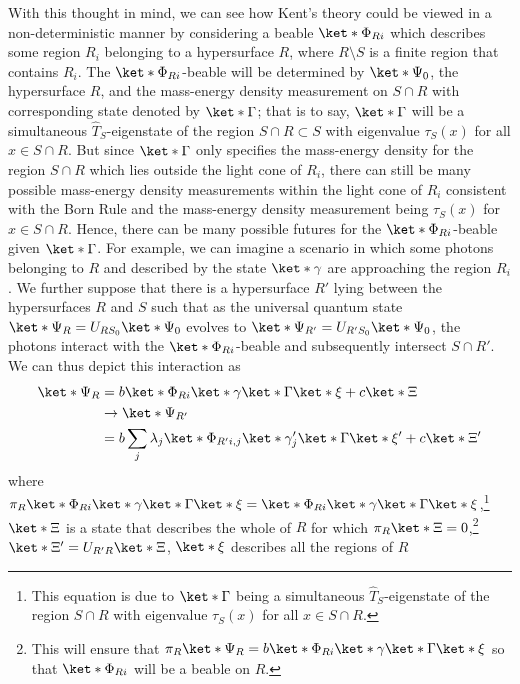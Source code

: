 \documentclass[12pt]{report}
\begin{document}
With this thought in mind,  we can see how Kent's theory could be viewed in a non-deterministic manner by considering a beable $\ket*{\Phi_{Ri}}$ which describes some region $R_i$ belonging to a hypersurface $R$, where $R\setminus S$ is a finite region that contains $R_i$. The $\ket*{\Phi_{Ri}}$-beable will be determined by $\ket*{\Psi_0}$, the hypersurface $R$, and the mass-energy density measurement on $S\cap R$ with corresponding state denoted by $\ket*{\Gamma}$; that is to say, $\ket*{\Gamma}$  will be a simultaneous $\hat{T}_S$-eigenstate of the region $S\cap R\subset S$ with eigenvalue $\tau_S(x)$ for all $x\in S\cap R$. But since $\ket*{\Gamma}$ only specifies the mass-energy density for the region  $S\cap R$ which lies outside the light cone of $R_i$, there can still be many possible mass-energy density measurements within the light cone of $R_i$ consistent with the Born Rule and the mass-energy density measurement being $\tau_S(x)$ for $x\in S\cap R$. Hence, there can be many possible futures for the $\ket*{\Phi_{Ri}}$-beable given $\ket*{\Gamma}$. For example, we can imagine a scenario in which some photons belonging to $R$ and described by the state $\ket*{\gamma}$ are approaching the region $R_i$. We further suppose that there is a hypersurface $R'$ lying between the hypersurfaces $R$ and $S$ such that as the universal quantum state $\ket*{\Psi_{R}}=U_{RS_0}\ket*{\Psi_0}$ evolves to $\ket*{\Psi_{{R'}}}=U_{{R'}S_0}\ket*{\Psi_0}$, the photons interact with the $\ket*{\Phi_{Ri}}$-beable and subsequently intersect $S\cap {R'}$. We can thus depict this interaction as
\begin{equation}\label{psirtopsirprime}
\begin{split}
\ket*{\Psi_{R}}&= b\ket*{\Phi_{Ri}}\ket*{\gamma}\ket*{\Gamma}\ket*{\xi}+c\ket*{\Xi}\\
&\rightarrow \ket*{\Psi_{{R'}}}\\
&=b\sum_j \lambda_j \ket*{\Phi_{R'i, j}}\ket*{\gamma_{j}'}\ket*{\Gamma}\ket*{\xi'}+c\ket*{\Xi'}
\end{split}
\end{equation}
where $\pi_R\ket*{\Phi_{Ri}}\ket*{\gamma}\ket*{\Gamma}\ket*{\xi}=\ket*{\Phi_{Ri}}\ket*{\gamma}\ket*{\Gamma}\ket*{\xi}$,\footnote{This equation is due to  $\ket*{\Gamma}$ being a simultaneous $\hat{T}_S$-eigenstate of the region $S\cap R$ with eigenvalue $\tau_S(x)$ for all $x\in S\cap R$.}  $\ket*{\Xi}$ is a state that describes the whole of $R$ for which $\pi_R\ket*{\Xi}=0$,\footnote{This will ensure that $\pi_R\ket*{\Psi_{R}}=b\ket*{\Phi_{Ri}}\ket*{\gamma}\ket*{\Gamma}\ket*{\xi}$ so that
$\ket*{\Phi_{Ri}}$ will be a beable on $R$.}  $\ket*{\Xi'}=U_{R'R}\ket*{\Xi}$,  $\ket*{\xi}$ describes all the regions of $R$ 
\end{document}
